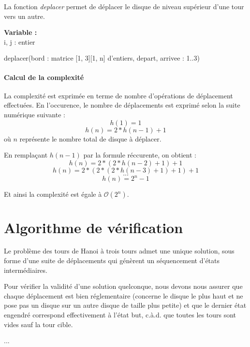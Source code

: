 La fonction \emph{deplacer} permet de déplacer le disque de niveau supérieur d'une tour vers un autre.

\begin{function}[H]
    \textbf{Variable :}\\
    i, j : entier\;
    \caption{deplacer(bord : matrice {[1, 3]}{[1, n]} d'entiers, depart, arrivee : 1..3)}
\end{function}

\paragraph{Calcul de la complexité}
La complexité est exprimée en terme de nombre d'opérations de déplacement effectuées. En l'occurence, le nombre de déplacements est exprimé selon la suite numérique suivante :
$$ h(1) = 1 $$
$$ h(n) = 2 * h(n - 1) + 1 $$
où $n$ représente le nombre total de disque à déplacer.

En remplaçant $h(n - 1)$ par la formule réccurente, on obtient :
$$ h(n) = 2 * (2 * h(n - 2) + 1) + 1 $$
$$ h(n) = 2 * (2 * (2 * h(n - 3) + 1) + 1) + 1 $$
$$ ... $$
$$ h(n) = 2^{n} - 1 $$

Et ainsi la complexité est égale à $\mathcal{O}(2^{n})$.

\section{Algorithme de vérification}
Le problème des tours de Hanoi à trois tours admet une unique solution, sous forme d'une suite de déplacements qui génèrent un séquencement d'états intermédiaires.
\par
Pour vérifier la validité d'une solution quelconque, nous devons nous assurer que chaque déplacement est bien réglementaire (concerne le disque le plus haut et ne pose pas un disque sur un autre disque de taille plus petite) et que le dernier état engendré correspond effectivement à l'état but, c.à.d. que toutes les tours sont vides sauf la tour cible.
\par
...
